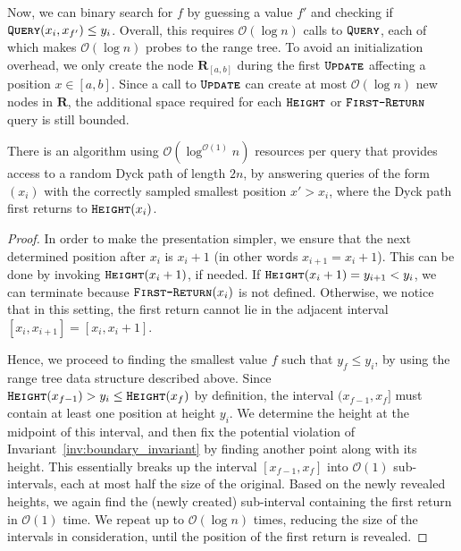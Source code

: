 Now, we can binary search for $f$ by guessing a value $f'$ and checking if $\texttt{\textsc{Query}}(x_i,x_{f'}) \le y_i$.
Overall, this requires $\mathcal O(\log n)$ calls to $\texttt{\textsc{Query}}$, each of which makes $\mathcal O(\log n)$ probes to the range tree.
To avoid an initialization overhead, we only create the node $\mathbf{R}_{[a,b]}$ during the first $\texttt{\textsc{Update}}$ affecting a position $x\in[a,b]$.
Since a call to $\texttt{\textsc{Update}}$ can create at most $\mathcal O(\log n)$ new nodes in $\mathbf R$,
the additional space required for each $\texttt{\textsc{Height}}$ or $\texttt{\textsc{First-Return}}$ query is still bounded.

\begin{theorem}
\label{thm:dyck_first_return_sampling}
There is an algorithm using $\mathcal O(\log^{\mathcal O(1)} n)$ resources per query that provides access to a random Dyck path of length $2n$,
by answering queries of the form $(x_i)$ with the correctly sampled smallest position $x'>x_i$,
where the Dyck path first returns to $\texttt{\textsc{Height}}(x_i)$.
\end{theorem}
\begin{proof}
In order to make the presentation simpler, we ensure that the next determined position after $x_i$ is $x_i+1$ (in other words $x_{i+1} = x_i + 1$).
This can be done by invoking $\texttt{\textsc{Height}}(x_i+1)$, if needed.
If $\texttt{\textsc{Height}}(x_i+1) = y_{i+1} < y_i$, we can terminate because $\texttt{\textsc{First-Return}}(x_i)$ is not defined.
Otherwise, we notice that in this setting, the first return cannot lie in the adjacent interval $[x_i,x_{i+1}] = [x_i, x_i+1]$.

Hence, we proceed to finding the smallest value $f$ such that $y_f \le y_i$, by using the range tree data structure described above.
Since $\texttt{\textsc{Height}}(x_{f-1}) > y_i \le \texttt{\textsc{Height}}(x_f)$ by definition,
the interval $(x_{f-1},x_f]$ must contain at least one position at height $y_i$.
We determine the height at the midpoint of this interval,
and then fix the potential violation of Invariant~\ref{inv:boundary_invariant} by finding another point along with its height.
This essentially breaks up the interval $[x_{f-1},x_f]$ into $\mathcal O(1)$ sub-intervals, each at most half the size of the original.
Based on the newly revealed heights, we again find the (newly created) sub-interval containing the first return in $\mathcal O(1)$ time.
We repeat up to $\mathcal O(\log n)$ times, reducing the size of the intervals in consideration, until the position of the first return is revealed.
\end{proof}

